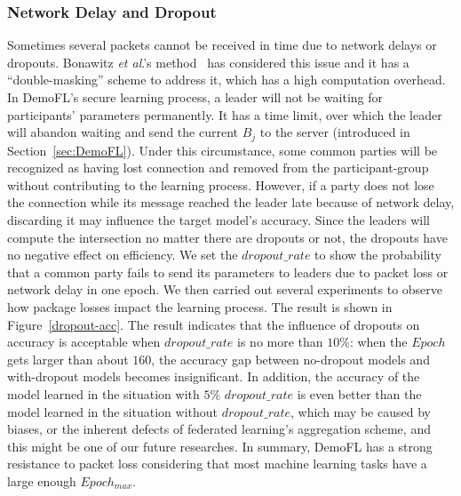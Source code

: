 \subsubsection{Network Delay and Dropout}
Sometimes several packets cannot be received in time due to network delays or dropouts. Bonawitz \emph{et al}.'s method~\cite{Practical} has considered this issue and it has a ``double-masking'' scheme to address it, which has a high computation overhead. In DemoFL's secure learning process, a leader will not be waiting for participants' parameters permanently. It has a time limit, over which the leader will abandon waiting and send the current $B_j$ to the server (introduced in Section~\ref{sec:DemoFL}). Under this circumstance, some common parties will be recognized as having lost connection and removed from the participant-group without contributing to the learning process. However, if a party does not lose the connection while its message reached the leader late because of network delay, discarding it may influence the target model's accuracy. Since the leaders will compute the intersection no matter there are dropouts or not, the dropouts have no negative effect on efficiency. We set the $dropout\_rate$ to show the probability that a common party fails to send its parameters to leaders due to packet loss or network delay in one epoch. We then carried out several experiments to observe how package losses impact the learning process. The result is shown in Figure~\ref{dropout-acc}. The result indicates that the influence of dropouts on accuracy is acceptable when $dropout\_rate$ is no more than $10\%$: when the $Epoch$ gets larger than about $160$, the accuracy gap between no-dropout models and with-dropout models becomes insignificant. In addition, the accuracy of the model learned in the situation with $5\%$ $dropout\_rate$ is even better than the model learned in the situation without $dropout\_rate$,  which may be caused by biases, or the inherent defects of federated learning's aggregation scheme, and this might be one of our future researches. In summary, DemoFL has a strong resistance to packet loss considering that most machine learning tasks have a large enough $Epoch_{max}$.